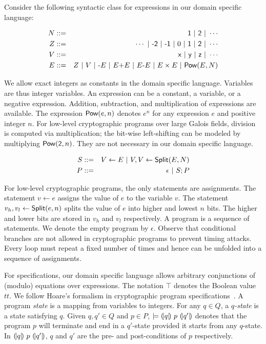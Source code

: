 
Consider the following syntactic class for expressions in our domain
specific language:

\begin{eqnarray*}
  N & ::= & \dslcode{1}\ |\ \dslcode{2}\ |\ \cdots\\
  Z & ::= & \cdots \ |\ \dslcode{-2}\ |\ \dslcode{-1} \ |\ 0\ |\ 
            \dslcode{1}\ |\ \dslcode{2}\ |\ \cdots\\
  V & ::= & \dslcode{x} \ |\ \dslcode{y} \ |\ \dslcode{z} \ |\ \cdots\\
  E & ::= &  Z \ |\ V \ |\  \dslcode{-}E \ |\ E \dslcode{+} E 
             \ |\ E \dslcode{-} E
             \ |\ E \times E \ |\ \dslcode{Pow} (E, N)
\end{eqnarray*}

We allow exact integers as constants in the domain specific
language. Variables are thus integer variables. An expression can be a
constant, a variable, or a negative expression. Addition, subtraction,
and multiplication of expressions are available. The expression
$\mbox{\textsf{Pow}}(e, n)$ denotes $e^n$ for any expression $e$ and positive
integer $n$. For low-level cryptographic programs over large Galois
fields, division is computed via multiplication; the bit-wise
left-shifting can be modeled by multiplying
$\mbox{\textsf{Pow}}(\mbox{\textsf{2}}, n)$. They are not necessary in our
domain specific language. 

\begin{eqnarray*}
  S & ::= & V \leftarrow E 
            \ |\  V, V \leftarrow \mbox{\textsf{Split}} (E, N)\\
  P & ::= & \epsilon \ |\ S; P
\end{eqnarray*}

For low-level cryptographic programs, the only statements are
assignments. The statement $v \leftarrow e$ assigns the value of $e$
to the variable $v$. The statement $v_h, v_l \leftarrow
\mbox{\textsf{Split}}(e, n)$ splits the value of $e$ into higher and lowest
$n$ bits. The higher and lower bits are stored in $v_h$ and $v_l$
respectively. A program is a sequence of statements. We denote the
empty program by $\epsilon$. Observe that conditional branches are not
allowed in cryptographic programs to prevent timing attacks. Every
loop must repeat a fixed number of times and hence can be unfolded
into a sequence of assignments.

For specifications, our domain specific language allows arbitrary
conjunctions of (modulo) equations over expressions. The notation
$\top$ denotes the Boolean value $\mathit{tt}$. We follow Hoare's
formalism in cryptographic program specifications~\cite{H:69:ABCP}. A program
\textit{state} is a mapping from variables to integers. For any $q \in
Q$, a \emph{$q$-state} is a state satisfying $q$.
Given $q, q' \in Q$ and $p \in P$, $\models {(\!|}{q}{|\!)}~{p}~{(\!|}{q'}{|\!)}$
denotes that the program $p$ will terminate and end in a $q'$-state
provided it starts from any $q$-state. In ${(\!|}{q}{|\!)}~{p}~{(\!|}{q'}{|\!)}$,
$q$ and $q'$ are the pre- and post-conditions of $p$ respectively.

